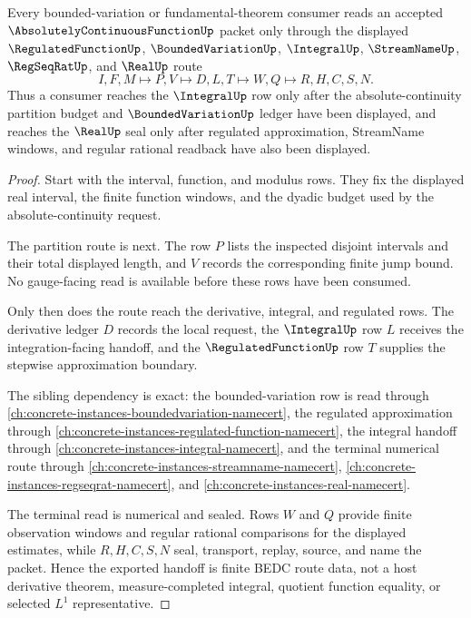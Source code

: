 \begin{theorem}
\label{thm:absolute-continuous-function-bounded-variation-handoff}
Every bounded-variation or fundamental-theorem consumer reads an accepted $\AbsolutelyContinuousFunctionUp$ packet only through the displayed $\RegulatedFunctionUp$, $\BoundedVariationUp$, $\IntegralUp$, $\StreamNameUp$, $\RegSeqRatUp$, and $\RealUp$ route
$$
I,F,M\longmapsto P,V\longmapsto D,L,T\longmapsto W,Q\longmapsto R,H,C,S,N .
$$
Thus a consumer reaches the $\IntegralUp$ row only after the absolute-continuity partition budget and $\BoundedVariationUp$ ledger have been displayed, and reaches the $\RealUp$ seal only after regulated approximation, StreamName windows, and regular rational readback have also been displayed.
\end{theorem}
\begin{proof}
Start with the interval, function, and modulus rows. They fix the displayed real interval, the finite function windows, and the dyadic budget used by the absolute-continuity request.

The partition route is next. The row $P$ lists the inspected disjoint intervals and their total displayed length, and $V$ records the corresponding finite jump bound. No gauge-facing read is available before these rows have been consumed.

Only then does the route reach the derivative, integral, and regulated rows. The derivative ledger $D$ records the local request, the $\IntegralUp$ row $L$ receives the integration-facing handoff, and the $\RegulatedFunctionUp$ row $T$ supplies the stepwise approximation boundary.

The sibling dependency is exact: the bounded-variation row is read through \autoref{ch:concrete-instances-boundedvariation-namecert}, the regulated approximation through \autoref{ch:concrete-instances-regulated-function-namecert}, the integral handoff through \autoref{ch:concrete-instances-integral-namecert}, and the terminal numerical route through \autoref{ch:concrete-instances-streamname-namecert}, \autoref{ch:concrete-instances-regseqrat-namecert}, and \autoref{ch:concrete-instances-real-namecert}.

The terminal read is numerical and sealed. Rows $W$ and $Q$ provide finite observation windows and regular rational comparisons for the displayed estimates, while $R,H,C,S,N$ seal, transport, replay, source, and name the packet. Hence the exported handoff is finite BEDC route data, not a host derivative theorem, measure-completed integral, quotient function equality, or selected $L^1$ representative.
\end{proof}

